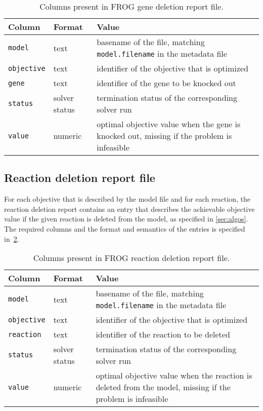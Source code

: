 \begin{table}\tablefont
\begin{tabular}{llp{30em}}
\toprule
Column & Format & Value \\
\midrule
\verb|model|
 & text
 & basename of the file, matching \verb|model.filename| in the metadata file
 \\
\verb|objective|
 & text
 & identifier of the objective that is optimized
 \\
\verb|gene|
 & text
 & identifier of the gene to be knocked out
 \\
\verb|status|
 & solver status
 & termination status of the corresponding solver run
 \\
\verb|value|
 & numeric
 & optimal objective value when the gene is knocked out, missing if the problem is infeasible
 \\
\bottomrule
\end{tabular}
\caption{Columns present in FROG gene deletion report file.}
\label{tab:genefields}
\end{table}

\subsection{Reaction deletion report file}
\label{sec:rxns}

For each objective that is described by the model file and for each reaction, the reaction deletion report contains an entry that describes the achievable objective value if the given reaction is deleted from the model, as specified in \cref{sec:algos}. The required columns and the format and semantics of the entries is specified in~\cref{tab:rxnsfields}.

\begin{table}\tablefont
\begin{tabular}{llp{30em}}
\toprule
Column & Format & Value \\
\midrule
\verb|model|
 & text
 & basename of the file, matching \verb|model.filename| in the metadata file
 \\
\verb|objective|
 & text
 & identifier of the objective that is optimized
 \\
\verb|reaction|
 & text
 & identifier of the reaction to be deleted
 \\
\verb|status|
 & solver status
 & termination status of the corresponding solver run
 \\
\verb|value|
 & numeric
 & optimal objective value when the reaction is deleted from the model, missing if the problem is infeasible
 \\
\bottomrule
\end{tabular}
\caption{Columns present in FROG reaction deletion report file.}
\label{tab:rxnsfields}
\end{table}
